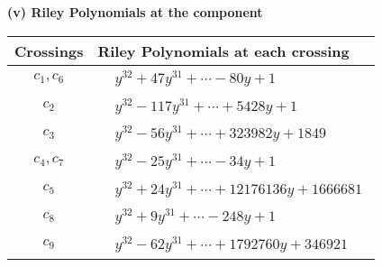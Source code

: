 \documentclass[1p]{elsarticle_modified}
\theoremstyle{definition}
\begin{document}
\newpage\renewcommand{\arraystretch}{1}
\flushleft \textbf{(v) Riley Polynomials at the component}\newline \\
\begin{tabular}{m{50pt}|m{274pt}}
Crossings & \hspace{64pt}Riley Polynomials at each crossing \\
\hline $$\begin{aligned}c_{1},c_{6}\end{aligned}$$&$\begin{aligned}
&y^{32}+47 y^{31}+\cdots-80 y+1
\end{aligned}$\\
\hline $$\begin{aligned}c_{2}\end{aligned}$$&$\begin{aligned}
&y^{32}-117 y^{31}+\cdots+5428 y+1
\end{aligned}$\\
\hline $$\begin{aligned}c_{3}\end{aligned}$$&$\begin{aligned}
&y^{32}-56 y^{31}+\cdots+323982 y+1849
\end{aligned}$\\
\hline $$\begin{aligned}c_{4},c_{7}\end{aligned}$$&$\begin{aligned}
&y^{32}-25 y^{31}+\cdots-34 y+1
\end{aligned}$\\
\hline $$\begin{aligned}c_{5}\end{aligned}$$&$\begin{aligned}
&y^{32}+24 y^{31}+\cdots+12176136 y+1666681
\end{aligned}$\\
\hline $$\begin{aligned}c_{8}\end{aligned}$$&$\begin{aligned}
&y^{32}+9 y^{31}+\cdots-248 y+1
\end{aligned}$\\
\hline $$\begin{aligned}c_{9}\end{aligned}$$&$\begin{aligned}
&y^{32}-62 y^{31}+\cdots+1792760 y+346921
\end{aligned}$\\

\end{tabular}
\end{document}
